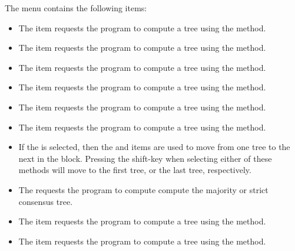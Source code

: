 \documentclass[11pt]{article}
\begin{document}
The  menu contains the following items:
\begin{itemize}
\item The  item
requests the program to compute a tree using the  method.
\item The  item
requests the program to compute a tree using the  method.
\item The  item
requests the program to compute a tree using the  method.
\item The  item
requests the program to compute a tree using the  method.
\item The  item
requests the program to compute a tree using the  method.
\item The  item
requests the program to compute a tree using the  method.
\item
If the  is selected, then
the  and
 items are used to move from one tree to the
next in the  block.
Pressing the shift-key when selecting either of these methods will
move to the first tree, or the last tree,
respectively.
\item The  requests the program
to compute compute the majority or strict consensus tree.
\item The  item
requests the program to compute a tree using the  method.
\item The  item
requests the program to compute a tree using the  method.
\end{itemize}
\end{document}
